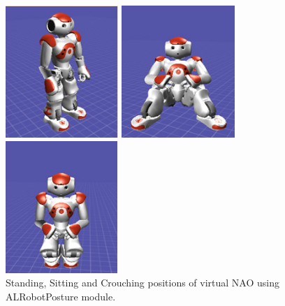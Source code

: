 \begin{figure}
	\centering 
	\begin{minipage}
		{.3 
		\textwidth} \centering 
		\includegraphics[height=5cm]{figures/content/nao-stand.jpg} 
	\end{minipage}
	\begin{minipage}
		{.3 
		\textwidth} \centering 
		\includegraphics[height=5cm]{figures/content/nao-sit.jpg} 
	\end{minipage}
	\begin{minipage}
		{.3 
		\textwidth} \centering 
		\includegraphics[height=5cm]{figures/content/nao-crouch.jpg} 
	\end{minipage}
	\caption{Standing, Sitting and Crouching positions of virtual NAO using ALRobotPosture module. \cite{nao-spec}} \label{fg:nao:motion} 
\end{figure}
